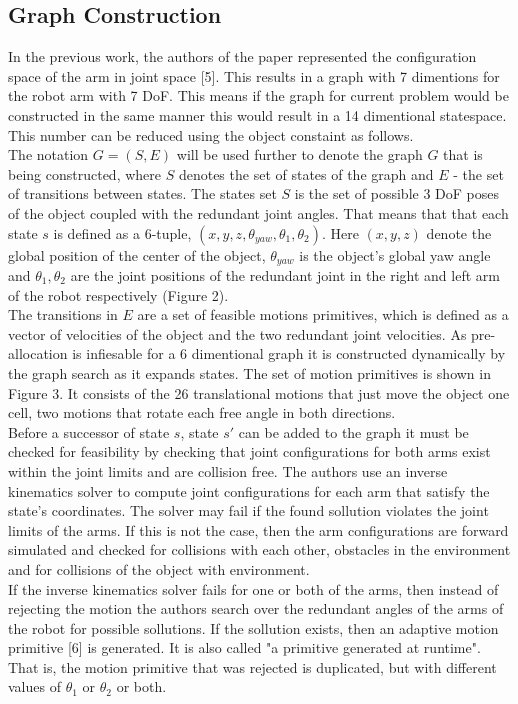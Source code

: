 \documentclass[11pt]{article}
\begin{document}
\subsection{Graph Construction}
In the previous work, the authors of the paper  represented the configuration space of the arm in joint space [5]. This results in a graph with 7 dimentions for the robot arm with 7 DoF. This means if the graph for current problem would be constructed in the same manner this would result in a 14 dimentional statespace. This number can be reduced using the object constaint as follows.\\
The notation $G=(S,E)$ will be used further to denote the graph $G$ that is being constructed, where $S$ denotes the set of states of the graph and $E$ - the set of transitions between states. The states set $S$ is the set of possible 3 DoF poses of the object coupled with the redundant joint angles. That means that that each state $s$ is defined as a 6-tuple, $(x,y,z,\theta_{yaw}, \theta_1, \theta_2)$. Here $(x,y,z)$ denote the global position of the center of the object, $\theta_{yaw}$ is the object's global yaw angle and $\theta_1, \theta_2$ are the joint positions of the redundant joint in the right and left arm of the robot respectively (Figure 2).\\
The transitions in $E$ are a set of feasible motions primitives, which is defined as a vector of velocities of the object and the two redundant joint velocities. As pre-allocation is infiesable for a 6 dimentional graph it is constructed dynamically by the graph search as it expands states. The set of motion primitives is shown in Figure 3. It consists of the 26 translational motions that just move the object one cell, two motions that rotate each free angle in both directions.\\
Before a successor of state $s$, state $s'$ can be added to the graph it must be checked for feasibility by checking that joint configurations for both arms exist within the joint limits and are collision free. The authors use an inverse kinematics solver to compute joint configurations for each arm that satisfy the state's coordinates. The solver may fail if the found sollution violates the joint limits of the arms. If this is not the case, then the arm configurations are forward simulated and checked for collisions with each other, obstacles in the environment and for collisions of the object with environment.\\
If the inverse kinematics solver fails for one or both of the arms, then instead of rejecting the motion the authors search over the redundant angles of the arms of the robot for possible sollutions. If the sollution exists, then an adaptive motion primitive [6] is generated. It is also called "a primitive generated at runtime". That is, the motion primitive that was rejected is duplicated, but with different values of $ \theta_1 $ or $ \theta_2 $ or both.\\
\end{document}
